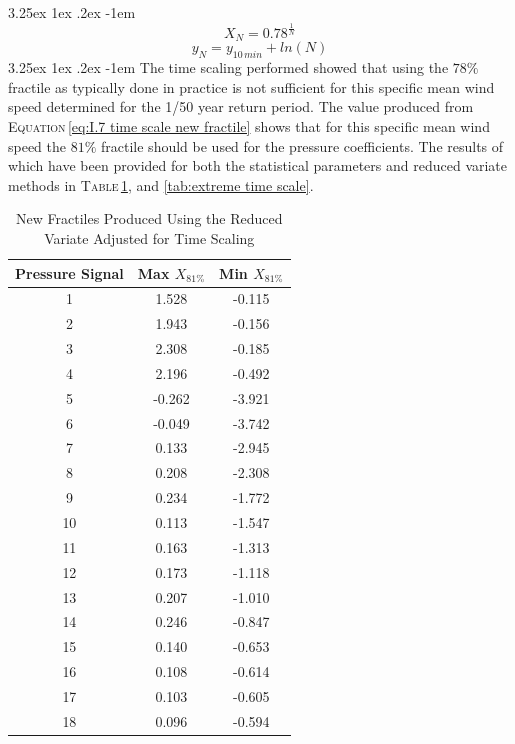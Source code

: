 \documentclass[11pt,a4paper,titlepage]{report}
\makeatletter
\renewcommand\paragraph{\@startsection{paragraph}{5}{\z@}%
  {3.25ex \@plus1ex \@minus.2ex}%
  {-1em}%
  {\normalfont\normalsize\bfseries}}
\makeatother
\begin{document}
\paragraph{}
\begin{equation}
    X_N=0.78^{\frac{1}{N}}
    \label{eq:I.7 time scale new fractile}
\end{equation}
\begin{equation}
    y_N=y_{10\,min}+ln(N)
    \label{eq:I.8 y variable scaled}
\end{equation}
\paragraph{}The time scaling performed showed that using the $78\%$ fractile as typically done in practice is not sufficient for this specific mean wind speed determined for the 1/50 year return period. The value produced from \textsc{Equation}\,\eqref{eq:I.7 time scale new fractile} shows that for this specific mean wind speed the $81\%$ fractile should be used for the pressure coefficients. The results of which have been provided for both the statistical parameters and reduced variate methods in \textsc{Table}\,\ref{tab:time scale fractiles}, and \ref{tab:extreme time scale}.
\begin{table}[]
    \centering
    \begin{tabular}{c|c|c}
       Pressure Signal & Max $X_{81\%}$ & Min $X_{81\%}$ \\
       \hline
1  & 1.528  & -0.115 \\
2  & 1.943  & -0.156 \\
3  & 2.308  & -0.185 \\
4  & 2.196  & -0.492 \\
5  & -0.262 & -3.921 \\
6  & -0.049 & -3.742 \\
7  & 0.133  & -2.945 \\
8  & 0.208  & -2.308 \\
9  & 0.234  & -1.772 \\
10 & 0.113  & -1.547 \\
11 & 0.163  & -1.313 \\
12 & 0.173  & -1.118 \\
13 & 0.207  & -1.010 \\
14 & 0.246  & -0.847 \\
15 & 0.140  & -0.653 \\
16 & 0.108  & -0.614 \\
17 & 0.103  & -0.605 \\
18 & 0.096  & -0.594
    \end{tabular}
    \caption{New Fractiles Produced Using the Reduced Variate Adjusted for Time Scaling}
    \label{tab:time scale fractiles}
\end{table}
\end{document}
